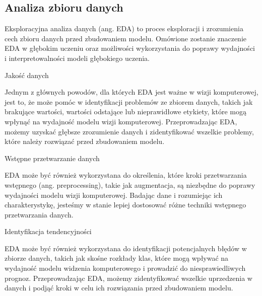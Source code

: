 \subsection{Analiza zbioru danych}
Eksploracyjna analiza danych (ang. EDA) to proces eksploracji i zrozumienia cech zbioru danych przed zbudowaniem modelu. Omówione zostanie znaczenie EDA w głębokim uczeniu oraz możliwości wykorzystania do poprawy wydajności i interpretowalności modeli głębokiego uczenia.

Jakość danych

Jednym z głównych powodów, dla których EDA jest ważne w wizji komputerowej, jest to, że może pomóc w identyfikacji problemów ze zbiorem danych, takich jak brakujące wartości, wartości odstające lub nieprawidłowe etykiety, które mogą wpłynąć na wydajność modelu wizji komputerowej. Przeprowadzając EDA, możemy uzyskać głębsze zrozumienie danych i zidentyfikować wszelkie problemy, które należy rozwiązać przed zbudowaniem modelu.

Wstępne przetwarzanie danych

EDA może być również wykorzystana do określenia, które kroki przetwarzania wstępnego (ang. preprocessing), takie jak augmentacja, są niezbędne do poprawy wydajności modelu wizji komputerowej. Badając dane i rozumiejąc ich charakterystykę, jesteśmy w stanie lepiej dostosować różne techniki wstępnego przetwarzania danych.

Identyfikacja tendencyjności

EDA może być również wykorzystana do identyfikacji potencjalnych błędów w zbiorze danych, takich jak skośne rozkłady klas, które mogą wpływać na wydajność modelu widzenia komputerowego i prowadzić do niesprawiedliwych prognoz. Przeprowadzając EDA, możemy zidentyfikować wszelkie uprzedzenia w danych i podjąć kroki w celu ich rozwiązania przed zbudowaniem modelu.



